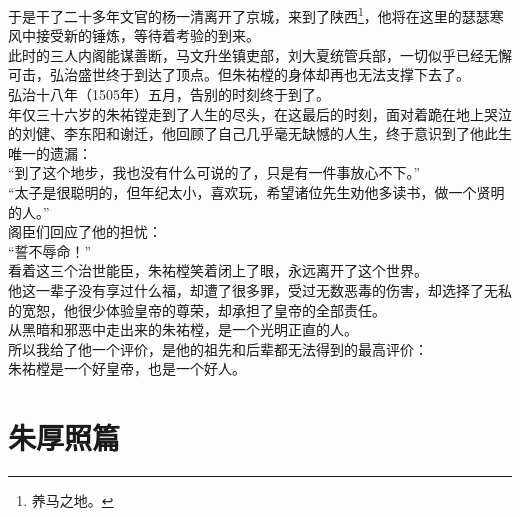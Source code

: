 \begin{multicols}{\theparacolNo}
于是干了二十多年文官的杨一清离开了京城，来到了陕西\footnote{养马之地。}，他将在这里的瑟瑟寒风中接受新的锤炼，等待着考验的到来。\\

此时的三人内阁能谋善断，马文升坐镇吏部，刘大夏统管兵部，一切似乎已经无懈可击，弘治盛世终于到达了顶点。但朱祐樘的身体却再也无法支撑下去了。\\

弘治十八年（1505年）五月，告别的时刻终于到了。\\

年仅三十六岁的朱祐镗走到了人生的尽头，在这最后的时刻，面对着跪在地上哭泣的刘健、李东阳和谢迁，他回顾了自己几乎毫无缺憾的人生，终于意识到了他此生唯一的遗漏：\\

“到了这个地步，我也没有什么可说的了，只是有一件事放心不下。”\\

“太子是很聪明的，但年纪太小，喜欢玩，希望诸位先生劝他多读书，做一个贤明的人。”\\

阁臣们回应了他的担忧：\\

“誓不辱命！”\\

看着这三个治世能臣，朱祐樘笑着闭上了眼，永远离开了这个世界。\\

他这一辈子没有享过什么福，却遭了很多罪，受过无数恶毒的伤害，却选择了无私的宽恕，他很少体验皇帝的尊荣，却承担了皇帝的全部责任。\\

从黑暗和邪恶中走出来的朱祐樘，是一个光明正直的人。\\

所以我给了他一个评价，是他的祖先和后辈都无法得到的最高评价：\\

朱祐樘是一个好皇帝，也是一个好人。\\
\ifnum{}
	\end{multicols}
\fi
\newpage
\chapter*{朱厚照篇}
